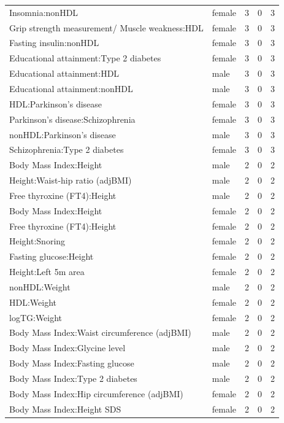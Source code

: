 \begin{table}[ht]
\begin{tabular}{llrrr}
  Insomnia:nonHDL & female &   3 &   0 &   3 \\ 
  Grip strength measurement/ Muscle weakness:HDL & female &   3 &   0 &   3 \\ 
  Fasting insulin:nonHDL & female &   3 &   0 &   3 \\ 
  Educational attainment:Type 2 diabetes & female &   3 &   0 &   3 \\ 
  Educational attainment:HDL & male &   3 &   0 &   3 \\ 
  Educational attainment:nonHDL & male &   3 &   0 &   3 \\ 
  HDL:Parkinson's disease & female &   3 &   0 &   3 \\ 
  Parkinson's disease:Schizophrenia & female &   3 &   0 &   3 \\ 
  nonHDL:Parkinson's disease & male &   3 &   0 &   3 \\ 
  Schizophrenia:Type 2 diabetes & female &   3 &   0 &   3 \\ 
  Body Mass Index:Height & male &   2 &   0 &   2 \\ 
  Height:Waist-hip ratio (adjBMI) & male &   2 &   0 &   2 \\ 
  Free thyroxine (FT4):Height & male &   2 &   0 &   2 \\ 
  Body Mass Index:Height & female &   2 &   0 &   2 \\ 
  Free thyroxine (FT4):Height & female &   2 &   0 &   2 \\ 
  Height:Snoring & female &   2 &   0 &   2 \\ 
  Fasting glucose:Height & female &   2 &   0 &   2 \\ 
  Height:Left 5m area & female &   2 &   0 &   2 \\ 
  nonHDL:Weight & male &   2 &   0 &   2 \\ 
  HDL:Weight & female &   2 &   0 &   2 \\ 
  logTG:Weight & female &   2 &   0 &   2 \\ 
  Body Mass Index:Waist circumference (adjBMI) & male &   2 &   0 &   2 \\ 
  Body Mass Index:Glycine level & male &   2 &   0 &   2 \\ 
  Body Mass Index:Fasting glucose & male &   2 &   0 &   2 \\ 
  Body Mass Index:Type 2 diabetes & male &   2 &   0 &   2 \\ 
  Body Mass Index:Hip circumference (adjBMI) & female &   2 &   0 &   2 \\ 
  Body Mass Index:Height SDS & female &   2 &   0 &   2 \\ 

\end{tabular}
\end{table}
